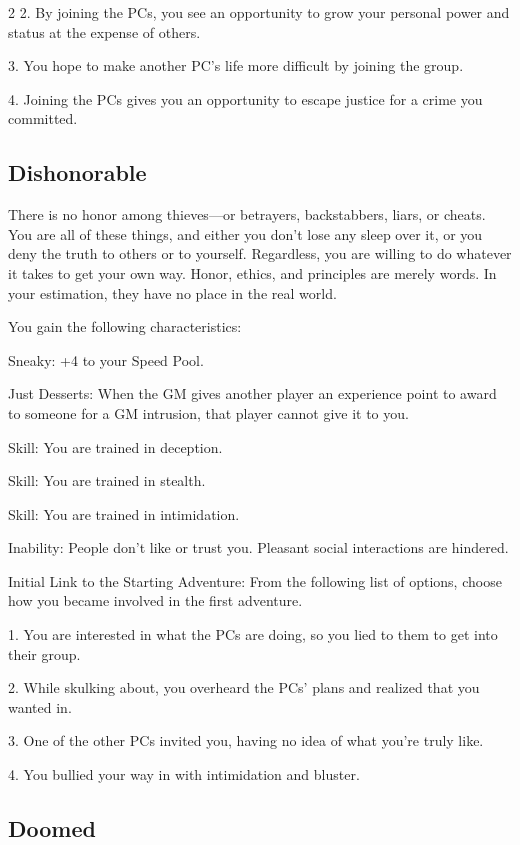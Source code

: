\begin{multicols}{2}
2. By joining the PCs, you see an opportunity to grow your personal power and status at the expense of others.

3. You hope to make another PC’s life more difficult by joining the group.

4. Joining the PCs gives you an opportunity to escape justice for a crime you committed. 

\subsection{Dishonorable}

There is no honor among thieves—or betrayers, backstabbers, liars, or cheats. You are all of these things, and either you don’t lose any sleep over it, or you deny the truth to others or to yourself. Regardless, you are willing to do whatever it takes to get your own way. Honor, ethics, and principles are merely words. In your estimation, they have no place in the real world.

You gain the following characteristics:

Sneaky: +4 to your Speed Pool.

Just Desserts: When the GM gives another player an experience point to award to someone for a GM intrusion, that player cannot give it to you.

Skill: You are trained in deception.

Skill: You are trained in stealth.

Skill: You are trained in intimidation.

Inability: People don’t like or trust you. Pleasant social interactions are hindered.

Initial Link to the Starting Adventure: From the following list of options, choose how you became involved in the first adventure.

1. You are interested in what the PCs are doing, so you lied to them to get into their group.

2. While skulking about, you overheard the PCs’ plans and realized that you wanted in.

3. One of the other PCs invited you, having no idea of what you’re truly like.

4. You bullied your way in with intimidation and bluster.

\subsection{Doomed}


\end{multicols}
